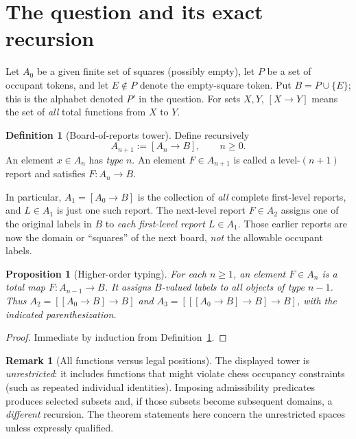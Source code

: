 \documentclass[11pt]{article}
\newtheorem{proposition}[theorem]{Proposition}
\theoremstyle{definition}
\newtheorem{definition}[theorem]{Definition}
\newtheorem{remark}[theorem]{Remark}
\newcommand{\Fun}[2]{[#1\to #2]}
\begin{document}
\section{The question and its exact recursion}
Let $A_0$ be a given finite set of squares (possibly empty), let $P$ be a set of occupant tokens, and let $E\notin P$ denote the empty-square token. Put $B=P\cup\{E\}$; this is the alphabet denoted $P'$ in the question. For sets $X,Y$, $\Fun X Y$ means the set of \emph{all} total functions from $X$ to $Y$.
\begin{definition}[Board-of-reports tower]\label{def:tower}
Define recursively
\[
\boxed{A_{n+1}:=\Fun{A_n}{B},\qquad n\ge 0.}
\]
An element $x\in A_n$ has \emph{type $n$}. An element $F\in A_{n+1}$ is called a level-$(n+1)$ report and satisfies $F:A_n\to B$.
\end{definition}
In particular, $A_1=\Fun{A_0}{B}$ is the collection of \emph{all} complete first-level reports, and $L\in A_1$ is just one such report. The next-level report $F\in A_2$ assigns one of the original labels in $B$ to \emph{each first-level report $L\in A_1$}. Those earlier reports are now the domain or ``squares'' of the next board, \emph{not} the allowable occupant labels.
\begin{proposition}[Higher-order typing]\label{prop:typing}
For each $n\ge1$, an element $F\in A_n$ is a total map $F:A_{n-1}\to B$. It assigns $B$-valued labels to all objects of type $n-1$. Thus $A_2=\Fun{\Fun{A_0}{B}}{B}$ and $A_3=\Fun{\Fun{\Fun{A_0}{B}}{B}}{B}$, with the indicated parenthesization.
\end{proposition}
\begin{proof}Immediate by induction from Definition~\ref{def:tower}.\end{proof}
\begin{remark}[All functions versus legal positions]
The displayed tower is \emph{unrestricted}: it includes functions that might violate chess occupancy constraints (such as repeated individual identities). Imposing admissibility predicates produces selected subsets and, if those subsets become subsequent domains, a \emph{different} recursion. The theorem statements here concern the unrestricted spaces unless expressly qualified.
\end{remark}
\end{document}
